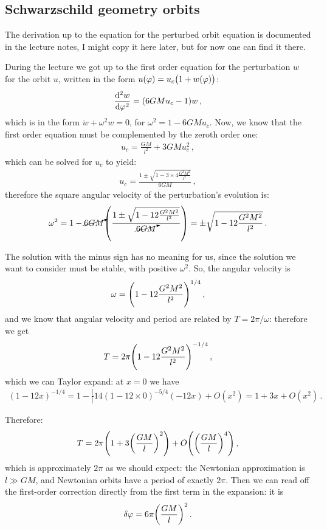 \documentclass[main.tex]{subfiles}
\begin{document}
\subsection{Schwarzschild geometry orbits}

The derivation up to the equation for the perturbed orbit equation is documented in the lecture notes, I might copy it here later, but for now one can find it there.

During the lecture we got up to the first order equation for the perturbation \(w\) for the orbit \(u\), written in the form \(u(\varphi ) = u_{c} \qty(1+w(\varphi ))\): 
%
\begin{align}
    \dv[2]{w}{\varphi }  = (6GMu_c-1) w
\,,
\end{align}
%
which is in the form \(\ddot{w} + \omega^2 w = 0\), for \(\omega^2 = 1- 6GMu_c\). Now, we know that the first order equation must be complemented by the zeroth order one: 
%
\begin{align}
    u_c = \frac{GM}{l^2} + 3GM u_c^{2}
\,,
\end{align}
%
which can be solved for \(u_c\) to yield: 
%
\begin{align}
  u_c = \frac{1 \pm \sqrt{1 - 3 \times 4 \frac{G^2 M^2}{l^2}}}{6GM}
\,,
\end{align}
%
therefore the square angular velocity of the perturbation's evolution is: 
%
\begin{align}
  \omega^2 = 1 - \cancelto{}{6GM} \qty(\frac{1 \pm \sqrt{1 - 12 \frac{G^2 M^2}{l^2}}}{ \cancelto{}{6GM}})
  = \pm \sqrt{1 - 12 \frac{G^2 M^2}{l^2}}
\,.
\end{align}

The solution with the minus sign has no meaning for us, since the solution we want to consider must be stable, with positive \(\omega^2\). So, the angular velocity is 
%
\begin{align}
  \omega = \qty(1 - 12 \frac{G^2M^2}{l^2})^{1/4}
\,,
\end{align}
%
and we know that angular velocity and period are related by \(T = 2 \pi / \omega \): therefore we get 
%
\begin{align}
  T = 2 \pi \qty(1 - 12 \frac{G^2M^2}{l^2})^{-1/4}
\,,
\end{align}
%
which we can Taylor expand: at \(x=0\) we have 
%
\begin{align}
    (1-12x)^{-1/4} = 1 - \frac[]{1}{4} (1-12 \times 0)^{-5/4} (-12x) + O(x^2) = 1 + 3x + O(x^2 )
\,.
\end{align}
%

Therefore: 
%
\begin{align}
  T = 2 \pi \qty(1 + 3 \qty(\frac{GM}{l})^2) + O\qty(\qty(\frac{GM}{l})^{4})
\,,
\end{align}
%
which is approximately \(2 \pi \) as we should expect: the Newtonian approximation is \(l \gg GM\), and Newtonian orbits have a period of exactly \(2 \pi \). Then we can read off the first-order correction directly from the first term in the expansion: it is 
%
\begin{align}
  \delta \varphi = 6 \pi \qty(\frac{GM}{l})^2
\,.
\end{align}
%
\end{document}

